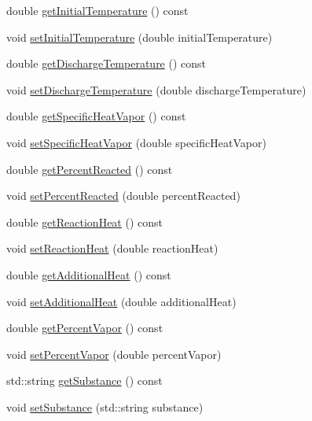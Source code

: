 \begin{DoxyCompactItemize}
double \hyperlink{class_gas_load_charge_material_af8a83c3720d108baa196394105822db7}{get\+Initial\+Temperature} () const
\item 
void \hyperlink{class_gas_load_charge_material_aec9ddfce5e31099b6a047e3d98d80d47}{set\+Initial\+Temperature} (double initial\+Temperature)
\item 
double \hyperlink{class_gas_load_charge_material_a6baaf6ad65e2a3d1fa90b7c007bc3c53}{get\+Discharge\+Temperature} () const
\item 
void \hyperlink{class_gas_load_charge_material_a6c53344d5370a1e9b7321a530a6843c0}{set\+Discharge\+Temperature} (double discharge\+Temperature)
\item 
double \hyperlink{class_gas_load_charge_material_a9a07e86938bb831e51ac3f53f696a3c3}{get\+Specific\+Heat\+Vapor} () const
\item 
void \hyperlink{class_gas_load_charge_material_a7498eba84bb8bdfc5344f0e44418260b}{set\+Specific\+Heat\+Vapor} (double specific\+Heat\+Vapor)
\item 
double \hyperlink{class_gas_load_charge_material_af47b4c6c3e547325cadd81cbb09937ee}{get\+Percent\+Reacted} () const
\item 
void \hyperlink{class_gas_load_charge_material_a7142cb6bbfba53d640dd6f1590fe32f6}{set\+Percent\+Reacted} (double percent\+Reacted)
\item 
double \hyperlink{class_gas_load_charge_material_a605eaf21d1f25f27b53627aeb903c93d}{get\+Reaction\+Heat} () const
\item 
void \hyperlink{class_gas_load_charge_material_a721f02cbd0bfbb6ebe67c0da09f0b0f2}{set\+Reaction\+Heat} (double reaction\+Heat)
\item 
double \hyperlink{class_gas_load_charge_material_a5c01f171b61c01c93db6453cb122e1ba}{get\+Additional\+Heat} () const
\item 
void \hyperlink{class_gas_load_charge_material_a08ef5196ea9919dfc71be6744c7da08e}{set\+Additional\+Heat} (double additional\+Heat)
\item 
double \hyperlink{class_gas_load_charge_material_a19b8ecfad235b5824b0a88903cff667a}{get\+Percent\+Vapor} () const
\item 
void \hyperlink{class_gas_load_charge_material_acace81e16ef531acb0a68462ab0ed25d}{set\+Percent\+Vapor} (double percent\+Vapor)
\item 
std\+::string \hyperlink{class_gas_load_charge_material_a5f967841f196f6b0b35f32f9610092e3}{get\+Substance} () const
\item 
void \hyperlink{class_gas_load_charge_material_a20cc3df601d8daae9b8f8e7b0c53c2e3}{set\+Substance} (std\+::string substance)

\end{DoxyCompactItemize}
